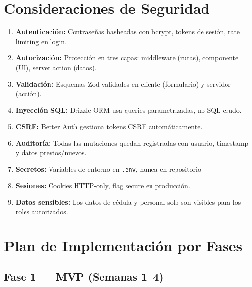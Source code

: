 \documentclass[10pt,a4paper]{article}
\begin{document}

\section{Consideraciones de Seguridad}

\begin{enumerate}[leftmargin=2em]
    \item \textbf{Autenticaci\'{o}n:} Contraseñas hasheadas con bcrypt, tokens de sesi\'{o}n, rate limiting en login.
    \item \textbf{Autorizaci\'{o}n:} Protecci\'{o}n en tres capas: middleware (rutas), componente (UI), server action (datos).
    \item \textbf{Validaci\'{o}n:} Esquemas Zod validados en cliente (formulario) y servidor (acci\'{o}n).
    \item \textbf{Inyecci\'{o}n SQL:} Drizzle ORM usa queries parametrizadas, no SQL crudo.
    \item \textbf{CSRF:} Better Auth gestiona tokens CSRF autom\'{a}ticamente.
    \item \textbf{Auditor\'{i}a:} Todas las mutaciones quedan registradas con usuario, timestamp y datos previos/nuevos.
    \item \textbf{Secretos:} Variables de entorno en \texttt{.env}, nunca en repositorio.
    \item \textbf{Sesiones:} Cookies HTTP-only, flag secure en producci\'{o}n.
    \item \textbf{Datos sensibles:} Los datos de c\'{e}dula y personal solo son visibles para los roles autorizados.
\end{enumerate}

\section{Plan de Implementaci\'{o}n por Fases}

\subsection{Fase 1 --- MVP (Semanas 1--4)}
\end{document}
